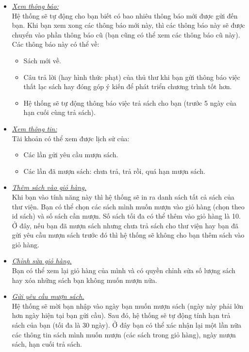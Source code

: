\documentclass[16pt,a4paper,oneside]{article}
\begin{document}
\begin{itemize}
	\item \underline{\textit{Xem thông báo:}}\\
	Hệ thống sẽ tự động cho bạn biết có bao nhiêu thông báo mới được gửi đến bạn. Khi bạn xem xong các thông báo mới này, thì các thông báo này sẽ được chuyển vào phần thông báo cũ (bạn cũng có thể xem các thông báo cũ này).\\
	 Các thông báo này có thể về:
	\begin{itemize}
		\item Sách mới về.
		\item Câu trả lời (hay hình thức phạt) của thủ thư khi bạn gửi  thông báo việc thất lạc sách hay đóng góp ý kiến để phát triển chương trình tốt hơn.
		\item Hệ thống sẽ tự động thông báo việc trả sách cho bạn (trước 5 ngày của hạn cuối cùng trả sách).
	\end{itemize}
	\item \underline{\textit{Xem thông tin:}}\\
	Tài khoản có thể xem được lịch sử của:
	\begin{itemize}
		\item Các lần gửi yêu cầu mượn sách.
		\item Các lần đã mượn sách: chưa trả, trả rồi, quá hạn mượn sách.
	\end{itemize}	
	\item \underline{\textit{Thêm sách vào giỏ hàng.}}\\
	Khi bạn vào tính năng này thì hệ thống sẽ in ra danh sách tất cả sách của thư viện. Bạn có thể chọn các sách mình muốn mượn vào giỏ hàng (chọn theo id sách) và số sách cần mượn. Số sách tối đa có thể thêm vào giỏ hàng là 10. Ở đây, nếu bạn đã mượn sách nhưng chưa trả sách cho thư viện hay bạn đã gửi yêu cầu mượn sách trước đó thì hệ thống sẽ không cho bạn thêm sách vào giỏ hàng.
	\item \underline{\textit{Chỉnh sửa giỏ hàng.}}\\
	Bạn có thể xem lại giỏ hàng của mình và có quyền chỉnh sửa số lượng sách hay xóa những sách bạn không muốn mượn nữa.
	\item \underline{\textit{Gửi yêu cầu mượn sách.}}\\
	Hệ thống sẽ mời bạn nhập vào ngày bạn muốn mượn sách (ngày này phải lớn hơn ngày hiện tại bạn gửi cầu). Sau đó, hệ thống sẽ tự động tính hạn trả sách của bạn (tối đa là 30 ngày). Ở đây bạn có thể xác nhận lại một lần nữa các thông tin sách mình muốn mượn (các sách trong giỏ hàng), ngày mượn sách, hạn cuối trả sách.

\end{itemize}
\end{document}
